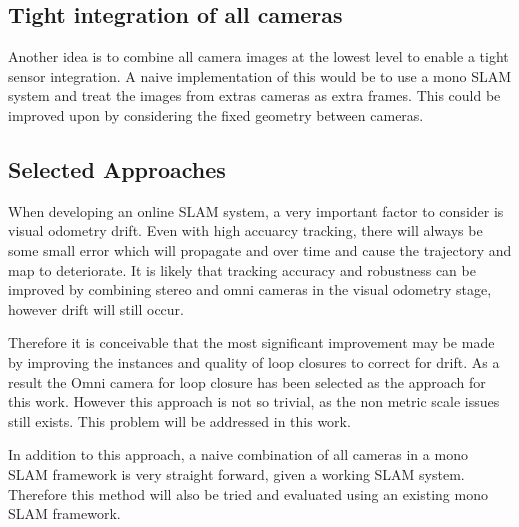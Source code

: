 \subsection{Tight integration of all cameras}

Another idea is to combine all camera images at the lowest level to enable a tight sensor integration.  A naive implementation of this would be to use a mono SLAM system and treat the images from extras cameras as extra frames.  This could be improved upon by considering the fixed geometry between cameras.

\subsection{Selected Approaches}

When developing an online SLAM system, a very important factor to consider is visual odometry drift.  Even with high accuarcy tracking, there will always be some small error which will propagate and over time and cause the trajectory and map to deteriorate. It is likely that tracking accuracy and robustness can be improved by combining stereo and omni cameras in the visual odometry stage, however drift will still occur.

Therefore it is conceivable that the most significant improvement may be made by improving the instances and quality of loop closures to correct for drift.  As a result the Omni camera for loop closure has been selected as the approach for this work.  However this approach is not so trivial, as the non metric scale issues still exists.  This problem will be addressed in this work.

In addition to this approach, a naive combination of all cameras in a mono SLAM framework is very straight forward, given a working SLAM system.  Therefore this method will also be tried and evaluated using an existing mono SLAM framework.